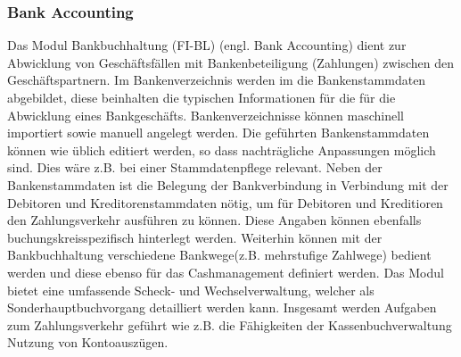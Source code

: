 \subsubsection{Bank Accounting} %
Das Modul Bankbuchhaltung (FI-BL) (engl. Bank Accounting) dient zur Abwicklung von Geschäftsfällen mit Bankenbeteiligung (Zahlungen) zwischen den Geschäftspartnern. 
Im Bankenverzeichnis werden im die Bankenstammdaten abgebildet, diese beinhalten die typischen Informationen für die für die Abwicklung eines Bankgeschäfts. Bankenverzeichnisse können maschinell importiert sowie manuell angelegt werden. Die geführten Bankenstammdaten können wie üblich editiert werden, so dass nachträgliche Anpassungen möglich sind. Dies wäre z.B. bei einer Stammdatenpflege relevant. Neben der Bankenstammdaten ist die Belegung der Bankverbindung in Verbindung mit der Debitoren und Kreditorenstammdaten nötig, um für Debitoren und Kreditioren den Zahlungsverkehr ausführen zu können. Diese Angaben können ebenfalls buchungskreisspezifisch hinterlegt werden. 
Weiterhin können mit der Bankbuchhaltung verschiedene Bankwege(z.B. mehrstufige Zahlwege) bedient werden und diese ebenso für das Cashmanagement definiert werden. Das Modul bietet eine umfassende Scheck- und Wechselverwaltung, welcher als Sonderhauptbuchvorgang detailliert werden kann. Insgesamt werden Aufgaben zum Zahlungsverkehr geführt wie z.B. die Fähigkeiten der Kassenbuchverwaltung Nutzung von Kontoauszügen.



